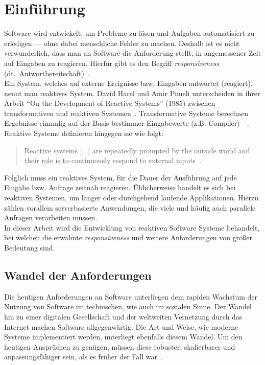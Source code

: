 \chapter{Einführung}\label{sec:einfuehrung}
Software wird entwickelt, um Probleme zu lösen und Aufgaben automatisiert zu erledigen --- ohne dabei menschliche Fehler zu machen. Deshalb ist es nicht verwunderlich, dass man an Software die Anforderung stellt, in angemessener Zeit auf Eingaben zu reagieren. Hierfür gibt es den Begriff \textit{responsiveness} (dt.\ Antwortbereitschaft)~\cite[S.~18]{kuhn_reactive_2015}.\\
Ein System, welches auf externe Ereignisse bzw. Eingaben antwortet (reagiert), nennt man reaktives System. David Harel und Amir Pnueli unterscheiden in ihrer Arbeit \enquote{On the Development of Reactive Systems} (1985) zwischen transformativen und reaktiven Systemen~\cite{harel_development_1985}. Transformative Systeme berechnen Ergebnisse einmalig auf der Basis bestimmer Eingabewerte (z.B. Compiler)~\cite[S.~2]{carkci_dataflow_2014}~\cite{wieringa_design_2003}. Reaktive Systeme definieren hingegen sie wie folgt:

\begin{quotation}
  Reactive systems [...] are repeatedly prompted by the outside world and their role is to continuously respond to external inputs~\cite{harel_development_1985}.
\end{quotation}

Folglich muss ein reaktives System, für die Dauer der Ausführung auf jede Eingabe bzw. Anfrage zeitnah reagieren. Üblicherweise handelt es sich bei reaktiven Systemen, um länger oder durchgehend laufende Applikationen. Hierzu zählen vorallem serverbasierte Anwendungen, die viele und häufig auch parallele Anfragen verarbeiten müssen.\\
In dieser Arbeit wird die Entwicklung von reaktiven Software Systeme behandelt, bei welchen die erwähnte \textit{responsiveness} und weitere Anforderungen von großer Bedeutung sind.

\pagebreak

\section{Wandel der Anforderungen}
Die heutigen Anforderungen an Software unterliegen dem rapiden Wachstum der Nutzung von Software im technischen, wie auch im sozialen Sinne. Der Wandel hin zu einer digitalen Gesellschaft und der weltweiten Vernetzung durch das Internet machen Software allgegenwärtig. Die Art und Weise, wie moderne Systeme implementiert werden, unterliegt ebenfalls diesem Wandel. Um den heutigen Ansprüchen zu genügen, müssen diese robuster, skalierbarer und anpassungsfähiger sein, als es früher der Fall war~\cite{boner_reactive_2014}.\\

